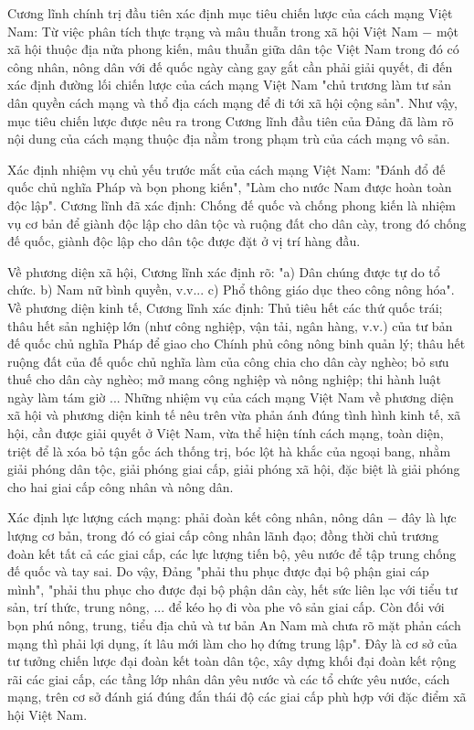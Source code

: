 Cương lĩnh chính trị đầu tiên xác định mục tiêu chiến lược của cách mạng Việt Nam: Từ việc phân tích thực trạng và mâu thuẫn trong xã hội Việt Nam $-$ một xã hội thuộc địa nửa phong kiến, mâu thuẫn giữa dân tộc Việt Nam trong đó có công nhân, nông dân với đế quốc ngày càng gay gắt cần phải giải quyết, đi đến xác định đường lối chiến lược của cách mạng Việt Nam "chủ trương làm tư sản dân quyền cách mạng và thổ địa cách mạng để đi tới xã hội cộng sản". Như vậy, mục tiêu chiến lược được nêu ra trong Cương lĩnh đầu tiên của Đảng đã làm rõ nội dung của cách mạng thuộc địa nằm trong phạm trù của cách mạng vô sản.

Xác định nhiệm vụ chủ yếu trước mắt của cách mạng Việt Nam: "Đánh đổ đế quốc chủ nghĩa Pháp và bọn phong kiến", "Làm cho nước Nam được hoàn toàn độc lập". Cương lĩnh đã xác định: Chống đế quốc và chống phong kiến là nhiệm vụ cơ bản để giành độc lập cho dân tộc và ruộng đất cho dân cày, trong đó chống đế quốc, giành độc lập cho dân tộc được đặt ở vị trí hàng đầu.

Về phương diện xã hội, Cương lĩnh xác định rõ: "a) Dân chúng được tự do tổ chức. b) Nam nữ bình quyền, v.v... c) Phổ thông giáo dục theo công nông hóa". Về phương diện kinh tế, Cương lĩnh xác định: Thủ tiêu hết các thứ quốc trái; thâu hết sản nghiệp lớn (như công nghiệp, vận tải, ngân hàng, v.v.) của tư bản đế quốc chủ nghĩa Pháp để giao cho Chính phủ công nông binh quản lý; thâu hết ruộng đất của đế quốc chủ nghĩa làm của công chia cho dân cày nghèo; bỏ sưu thuế cho dân cày nghèo; mở mang công nghiệp và nông nghiệp; thi hành luật ngày làm tám giờ ... Những nhiệm vụ của cách mạng Việt Nam về phương diện xã hội và phương diện kinh tế nêu trên vừa phản ánh đúng tình hình kinh tế, xã hội, cần được giải quyết ở Việt Nam, vừa thể hiện tính cách mạng, toàn diện, triệt để là xóa bỏ tận gốc ách thống trị, bóc lột hà khắc của ngoại bang, nhằm giải phóng dân tộc, giải phóng giai cấp, giải phóng xã hội, đặc biệt là giải phóng cho hai giai cấp công nhân và nông dân.

Xác định lực lượng cách mạng: phải đoàn kết công nhân, nông dân $-$ đây là lực lượng cơ bản, trong đó có giai cấp công nhân lãnh đạo; đồng thời chủ trương đoàn kết tất cả các giai cấp, các lực lượng tiến bộ, yêu nước để tập trung chống đế quốc và tay sai. Do vậy, Đảng "phải thu phục được đại bộ phận giai cáp mình", "phải thu phục cho được đại bộ phận dân cày, hết sức liên lạc với tiểu tư sản, trí thức, trung nông, ... để kéo họ đi vòa phe vô sản giai cấp. Còn đối với bọn phú nông, trung, tiểu địa chủ và tư bản An Nam mà chưa rõ mặt phản cách mạng thì phải lợi dụng, ít lâu mới làm cho họ đứng trung lập". Đây là cơ sở của tư tưởng chiến lược đại đoàn kết toàn dân tộc, xây dựng khối đại đoàn kết rộng rãi các giai cấp, các tầng lớp nhân dân yêu nước và các tổ chức yêu nước, cách mạng, trên cơ sở đánh giá đúng đắn thái độ các giai cấp phù hợp với đặc điểm xã hội Việt Nam.

